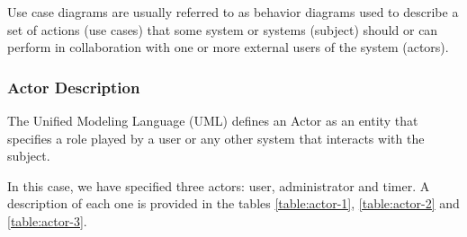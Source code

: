 Use case diagrams are usually referred to as behavior diagrams used to describe a set of actions (use cases) that some system or
systems (subject) should or can perform in collaboration with one or more external users of the system (actors).\cite{umlUseCaseDiagrams}

\subsubsection{Actor Description}

The Unified Modeling Language (UML)  defines an Actor as an entity that specifies a role played by a user or any other system 
that interacts with the subject.

In this case, we have specified three actors: user, administrator and timer. A description of each one is provided in the tables
\ref{table:actor-1}, \ref{table:actor-2} and \ref{table:actor-3}.

